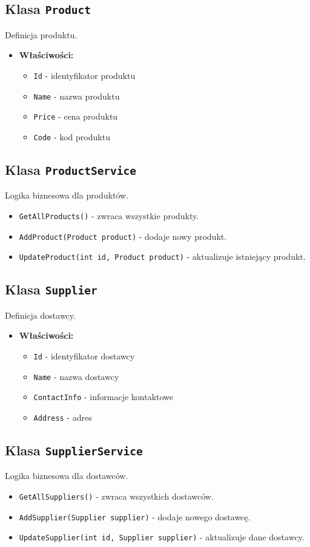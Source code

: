 \subsection{Klasa \texttt{Product}}
Definicja produktu.
\begin{itemize}
    \item \textbf{Właściwości:}
    \begin{itemize}
        \item \texttt{Id} - identyfikator produktu
        \item \texttt{Name} - nazwa produktu
        \item \texttt{Price} - cena produktu
        \item \texttt{Code} - kod produktu
    \end{itemize}
\end{itemize}

\subsection{Klasa \texttt{ProductService}}
Logika biznesowa dla produktów.
\begin{itemize}
    \item \texttt{GetAllProducts()} - zwraca wszystkie produkty.
    \item \texttt{AddProduct(Product product)} - dodaje nowy produkt.
    \item \texttt{UpdateProduct(int id, Product product)} - aktualizuje istniejący produkt.
\end{itemize}

\subsection{Klasa \texttt{Supplier}}
Definicja dostawcy.
\begin{itemize}
    \item \textbf{Właściwości:}
    \begin{itemize}
        \item \texttt{Id} - identyfikator dostawcy
        \item \texttt{Name} - nazwa dostawcy
        \item \texttt{ContactInfo} - informacje kontaktowe
        \item \texttt{Address} - adres
    \end{itemize}
\end{itemize}

\subsection{Klasa \texttt{SupplierService}}
Logika biznesowa dla dostawców.
\begin{itemize}
    \item \texttt{GetAllSuppliers()} - zwraca wszystkich dostawców.
    \item \texttt{AddSupplier(Supplier supplier)} - dodaje nowego dostawcę.
    \item \texttt{UpdateSupplier(int id, Supplier supplier)} - aktualizuje dane dostawcy.
\end{itemize}

